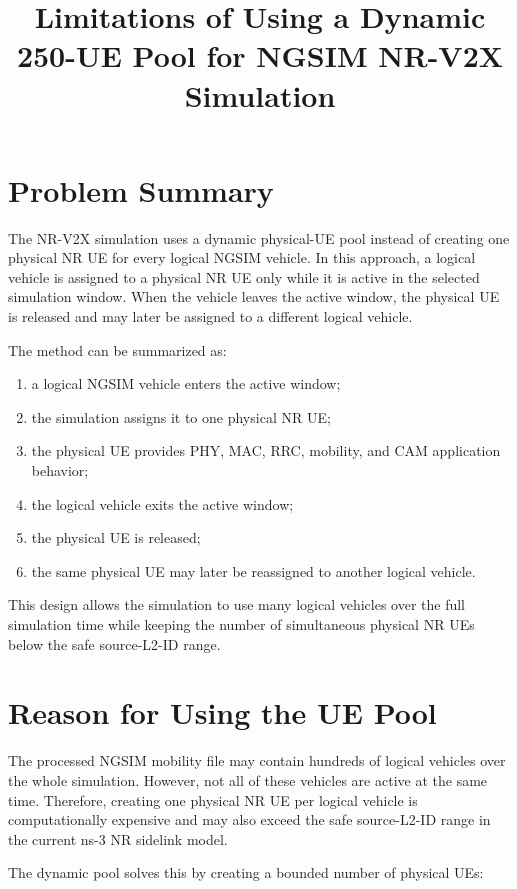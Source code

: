 \documentclass[11pt]{article}
\title{Limitations of Using a Dynamic 250-UE Pool for NGSIM NR-V2X Simulation}
\author{}
\date{}
\begin{document}
\maketitle

\section{Problem Summary}

The NR-V2X simulation uses a dynamic physical-UE pool instead of creating one physical NR UE for every logical NGSIM vehicle. In this approach, a logical vehicle is assigned to a physical NR UE only while it is active in the selected simulation window. When the vehicle leaves the active window, the physical UE is released and may later be assigned to a different logical vehicle.

The method can be summarized as:

\begin{enumerate}
    \item a logical NGSIM vehicle enters the active window;
    \item the simulation assigns it to one physical NR UE;
    \item the physical UE provides PHY, MAC, RRC, mobility, and CAM application behavior;
    \item the logical vehicle exits the active window;
    \item the physical UE is released;
    \item the same physical UE may later be reassigned to another logical vehicle.
\end{enumerate}

This design allows the simulation to use many logical vehicles over the full simulation time while keeping the number of simultaneous physical NR UEs below the safe source-L2-ID range.

\section{Reason for Using the UE Pool}

The processed NGSIM mobility file may contain hundreds of logical vehicles over the whole simulation. However, not all of these vehicles are active at the same time. Therefore, creating one physical NR UE per logical vehicle is computationally expensive and may also exceed the safe source-L2-ID range in the current ns-3 NR sidelink model.

The dynamic pool solves this by creating a bounded number of physical UEs:
\end{document}
